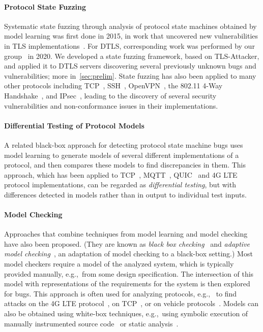 \documentclass[11pt]{article}
\newcommand{\system}[1]{\mbox{\textsf{#1}}}
\newcommand{\myparagraph}{}
\let\myparagraph=\paragraph
\renewcommand{\paragraph}{\vspace{-3mm}\myparagraph}
\newcommand{\eg}{e.\/g.,\ }
\begin{document}
\paragraph{Protocol State Fuzzing}
Systematic state fuzzing through analysis of protocol state machines obtained
by model learning was first done in 2015, in work that uncovered new
vulnerabilities in TLS implementations~\cite{ruiter2015}.
%
For DTLS, corresponding work was performed by our group~\cite{DTLS@USENIX-20}
in 2020.  We developed a state fuzzing framework,
based on \system{TLS-Attacker}, and applied it to DTLS servers discovering
several previously unknown bugs and vulnerabilities; more in~\cref{sec:prelim}.
%
State fuzzing has also been applied to many other protocols including
TCP~\cite{FJV2016}, SSH~\cite{SSH@SPIN-17},
OpenVPN~\cite{OpenVPN@EuroSPW-2018}, the 802.11 4-Way
Handshake~\cite{stone2018}, and IPsec~\cite{guo2019model}, leading to the
discovery of several security vulnerabilities and non-conformance issues in
their implementations.
%

\paragraph{Differential Testing of Protocol Models}
A related black-box approach for detecting protocol state machine bugs uses
model learning to generate models of several different implementations of a
protocol, and then compares these models to find discrepancies in them.
%
This approach, which has been applied to TCP~\cite{SFADiff},
MQTT~\cite{Tappler@ICST-2017}, QUIC~\cite{Prognosis@SIGCOMM-21} and 4G
LTE~\cite{DIKEUE@CCS-21} protocol implementations, can be regarded as
\emph{differential testing}, but with differences detected in models rather
than in output to individual test inputs.

\paragraph{Model Checking}
Approaches that combine techniques from model learning and model
checking~\cite{MC:handbook} have also been proposed.
%
(They are known as \emph{black box checking}~\cite{BBC} and \emph{adaptive
model checking}~\cite{AdaptiveMC}, an adaptation of model checking to a
black-box setting.)
%
Most model checkers require a model of the analyzed system, which is typically
provided manually, \eg from some design specification.  The intersection of
this model with representations of the requirements for the system is then
explored for bugs.  This approach is often used for analyzing protocols, \eg
to find attacks on the 4G LTE protocol~\cite{LTEInspector}, on
TCP~\cite{Jero@DSN-15}, or on vehicle protocols~\cite{Hu:usenix21}.
Models can also be obtained using white-box techniques, \eg using symbolic
execution of manually instrumented source code~\cite{Hoque@DSN-17,Themis:ccs21}
or static analysis~\cite{Cao:ccs19}.
\end{document}
